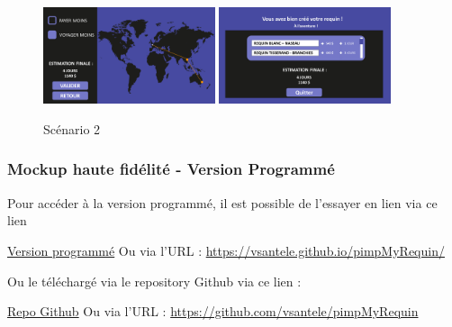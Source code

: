 \documentclass{article}
\begin{document}
\begin{figure}[!h]
	\includegraphics[width=0.45\textwidth]{assets/prototype/haute/Diapositive23}
	\hfill
	\includegraphics[width=0.45\textwidth]{assets/prototype/haute/Diapositive24}
	\caption{Scénario 2}
	\label{scenario2}
\end{figure}

\newpage
\subsubsection{Mockup haute fidélité - Version Programmé}

Pour accéder à la version programmé, il est possible de l'essayer en lien via ce lien

\href{https://vsantele.github.io/pimpMyRequin/}{Version programmé} 
Ou via l'URL : \url{https://vsantele.github.io/pimpMyRequin/}

Ou le téléchargé via le repository Github via ce lien :

\href{https://github.com/vsantele/pimpMyRequin}{Repo Github} 
Ou via l'URL : \url{https://github.com/vsantele/pimpMyRequin}
\end{document}
